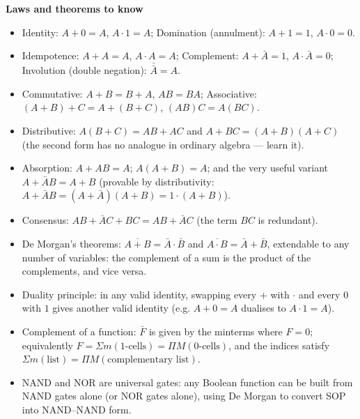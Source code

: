 \documentclass[11pt]{article}
\newcommand{\cle}[1]{{\popxbold\color{popdark}#1}}
\begin{document}
\begin{bilan}
\textbf{Laws and theorems to know}
\begin{itemize}
\item Identity: $A+0=A$, $A\cdot 1=A$; Domination (annulment): $A+1=1$, $A\cdot 0=0$.
\item Idempotence: $A+A=A$, $A\cdot A=A$; Complement: $A+\bar{A}=1$, $A\cdot\bar{A}=0$; Involution (double negation): $\bar{\bar{A}}=A$.
\item Commutative: $A+B=B+A$, $AB=BA$; Associative: $(A+B)+C=A+(B+C)$, $(AB)C=A(BC)$.
\item Distributive: $A(B+C)=AB+AC$ and $A+BC=(A+B)(A+C)$ (the second form has no analogue in ordinary algebra --- learn it).
\item Absorption: $A+AB=A$; $A(A+B)=A$; and the very useful variant $A+\bar{A}B=A+B$ (provable by distributivity: $A+\bar{A}B=(A+\bar{A})(A+B)=1\cdot(A+B)$).
\item Consensus: $AB+\bar{A}C+BC=AB+\bar{A}C$ (the term $BC$ is redundant).
\item \cle{De Morgan's theorems}: $\overline{A+B}=\bar{A}\cdot\bar{B}$ and $\overline{A\cdot B}=\bar{A}+\bar{B}$, extendable to any number of variables: the complement of a sum is the product of the complements, and vice versa.
\item \cle{Duality principle}: in any valid identity, swapping every $+$ with $\cdot$ and every $0$ with $1$ gives another valid identity (e.g. $A+0=A$ dualises to $A\cdot 1=A$).
\item Complement of a function: $\bar{F}$ is given by the minterms where $F=0$; equivalently $F=\Sigma m(\text{1-cells})=\Pi M(\text{0-cells})$, and the indices satisfy $\Sigma m(\text{list})=\Pi M(\text{complementary list})$.
\item NAND and NOR are \cle{universal gates}: any Boolean function can be built from NAND gates alone (or NOR gates alone), using De Morgan to convert SOP into NAND--NAND form.
\end{itemize}


\end{bilan}
\end{document}
